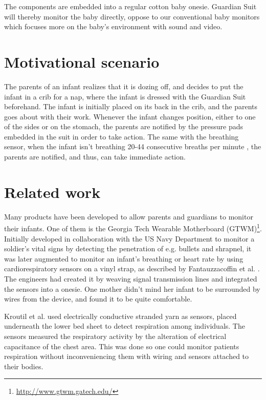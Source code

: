 \documentclass{sigchi-ext}
\begin{document}
The components are embedded into a regular cotton baby
onesie. Guardian Suit will thereby monitor the baby
directly, oppose to our conventional baby monitors which 
focuses more on the baby's environment with sound and video.

\section{Motivational scenario}
The parents of an infant realizes that it is dozing off, and decides to put the infant in a crib for a nap, where the infant is dressed with the Guardian Suit beforehand. The infant is initially placed on its back in the crib, and the parents goes about with their work. Whenever the infant changes position, either to one of the sides or on the stomach, the parents are notified by the pressure pads embedded in the suit in order to take action. The same with the breathing sensor, when the infant isn't breathing 20-44 consecutive breaths per minute \cite{a18-huang}, the parents are notified, and thus, can take immediate action.

\section{Related work}
Many products have been developed to allow parents and guardians to monitor their infants. One of them is the Georgia Tech Wearable Motherboard (GTWM)\footnote{\url{http://www.gtwm.gatech.edu/}}. Initially developed in collaboration with the US Navy Department to monitor a soldier's vital signs by detecting the penetration of e.g. bullets and shrapnel, it was later augmented to monitor an infant's breathing or heart rate by using cardiorespiratory sensors on a vinyl strap, as described by Fantauzzacoffin et al. \cite{p285-fantauzzacoffin}. The engineers had created it by weaving signal transmission lines and integrated the sensors into a onesie. One mother didn't mind her infant to be surrounded by wires from the device, and found it to be quite comfortable.

Kroutil et al. \cite{a33-kroutil} used electrically conductive stranded yarn as sensors, placed underneath the lower bed sheet to detect respiration among individuals. The sensors measured the respiratory activity by the alteration of electrical capacitance of the chest area. This was done so one could monitor patients respiration without inconveniencing them with wiring and sensors attached to their bodies.
\end{document}
